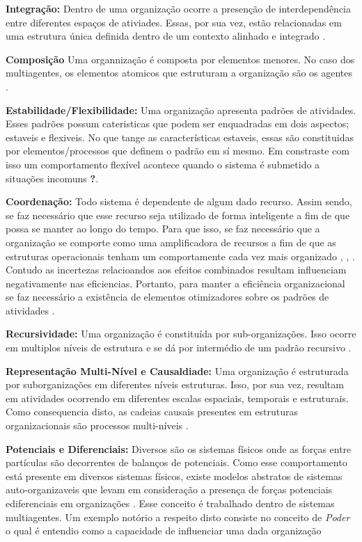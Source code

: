 \textbf{Integração:} Dentro de uma organização ocorre a presenção de interdependência entre diferentes espaços de ativiades. Essas, por sua vez, estão relacionadas em uma estrutura única definida
dentro de um contexto alinhado e integrado \cite{organiationofmultiagentsystem}.

\textbf{Composição} Uma organnização é composta por elementos menores. No caso dos multiagentes, os elementos atomicos que estruturam a organização são os agentes \cite{organiationofmultiagentsystem}.

\textbf{Estabilidade/Flexibilidade:} Uma organização apresenta padrões de atividades. Esses padrões possum cateristicas que podem ser enquadradas em dois aspectos; estaveis e flexiveis. 
No que tange as características estaveis, essas são constituidas por elementos/processos que definem o padrão em sí mesmo. Em constraste com isso um comportamento flexível acontece quando o 
sistema é submetido a situações incomuns \cite{organiationofmultiagentsystem} \textbf{?}.

\textbf{Coordenação:} Todo sistema é dependente de algum dado recurso. Assim sendo, se faz necessário que esse recurso seja utilizado de forma inteligente a fim de que possa se manter ao longo 
do tempo. Para que isso, se faz necessário que a organização se comporte como uma amplificadora de recursos a fim de que as estruturas operacionais tenham um comportamente cada vez mais organizado 
\cite{selforganization}, \cite{selforganizatioenvoriment}, \cite{defintionselforganization}. Contudo as incertezas relacioandos aos efeitos combinados resultam
influenciam negativamente nas eficiencias. Portanto, para manter a eficiência organizacional se faz necessário a existência de elementos otimizadores sobre os padrões de atividades \cite{organiationofmultiagentsystem}.

\textbf{Recursividade:} Uma organização é constituída por sub-organizações. Isso ocorre em multiplos níveis de estrutura e se dá por intermédio de um padrão recursivo \cite{organiationofmultiagentsystem}.

\textbf{Representação Multi-Nível e Causaldiade:} Uma organização é estruturada por suborganizações em diferentes níveis estruturas. Isso, por sua vez, resultam em atividades ocorrendo em 
diferentes escalas espaciais, temporais e estruturais. Como consequencia disto, as cadeias causais presentes em estruturas organizacionais são processos multi-níveis \cite{organiationofmultiagentsystem}.

\textbf{Potenciais e Diferenciais:} Diversos são os sistemas físicos onde as forças entre partículas são decorrentes de balanços de potenciais. Como esse comportamento está presente em diversos
sistemas físicos, existe modelos abstratos de sistemas auto-organizaveis que levam em consideração a presença de forças potenciais ediferenciais em organizações \cite{selforganizationdiffforce}. 
Esse conceito é trabalhado dentro de sistemas multiagentes. Um exemplo notório a respeito disto consiste no conceito de \textit{Poder} o qual é entendio como a capacidade de influenciar uma
dada organização \cite{organiationofmultiagentsystem}

